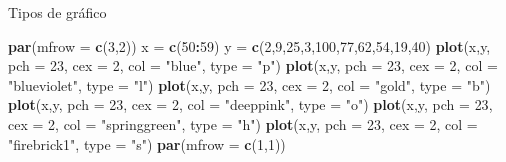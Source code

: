 \documentclass[
  ignorenonframetext,
]{beamer}
\newenvironment{Shaded}{\begin{snugshade}}{\end{snugshade}}
\newcommand{\AttributeTok}[1]{\textcolor[rgb]{0.13,0.29,0.53}{#1}}
\newcommand{\DecValTok}[1]{\textcolor[rgb]{0.00,0.00,0.81}{#1}}
\newcommand{\FunctionTok}[1]{\textcolor[rgb]{0.13,0.29,0.53}{\textbf{#1}}}
\newcommand{\NormalTok}[1]{#1}
\newcommand{\OtherTok}[1]{\textcolor[rgb]{0.56,0.35,0.01}{#1}}
\newcommand{\SpecialCharTok}[1]{\textcolor[rgb]{0.81,0.36,0.00}{\textbf{#1}}}
\newcommand{\StringTok}[1]{\textcolor[rgb]{0.31,0.60,0.02}{#1}}
\begin{document}
\begin{frame}[fragile]{Tipos de gráfico}
\label{tipos-de-gruxe1fico}
\begin{Shaded}
\begin{Highlighting}[]
\FunctionTok{par}\NormalTok{(}\AttributeTok{mfrow =} \FunctionTok{c}\NormalTok{(}\DecValTok{3}\NormalTok{,}\DecValTok{2}\NormalTok{))}
\NormalTok{x }\OtherTok{=} \FunctionTok{c}\NormalTok{(}\DecValTok{50}\SpecialCharTok{:}\DecValTok{59}\NormalTok{)}
\NormalTok{y }\OtherTok{=} \FunctionTok{c}\NormalTok{(}\DecValTok{2}\NormalTok{,}\DecValTok{9}\NormalTok{,}\DecValTok{25}\NormalTok{,}\DecValTok{3}\NormalTok{,}\DecValTok{100}\NormalTok{,}\DecValTok{77}\NormalTok{,}\DecValTok{62}\NormalTok{,}\DecValTok{54}\NormalTok{,}\DecValTok{19}\NormalTok{,}\DecValTok{40}\NormalTok{)}
\FunctionTok{plot}\NormalTok{(x,y, }\AttributeTok{pch =} \DecValTok{23}\NormalTok{, }\AttributeTok{cex =} \DecValTok{2}\NormalTok{, }\AttributeTok{col =} \StringTok{"blue"}\NormalTok{, }\AttributeTok{type =} \StringTok{"p"}\NormalTok{)}
\FunctionTok{plot}\NormalTok{(x,y, }\AttributeTok{pch =} \DecValTok{23}\NormalTok{, }\AttributeTok{cex =} \DecValTok{2}\NormalTok{, }\AttributeTok{col =} \StringTok{"blueviolet"}\NormalTok{, }\AttributeTok{type =} \StringTok{"l"}\NormalTok{)}
\FunctionTok{plot}\NormalTok{(x,y, }\AttributeTok{pch =} \DecValTok{23}\NormalTok{, }\AttributeTok{cex =} \DecValTok{2}\NormalTok{, }\AttributeTok{col =} \StringTok{"gold"}\NormalTok{, }\AttributeTok{type =} \StringTok{"b"}\NormalTok{)}
\FunctionTok{plot}\NormalTok{(x,y, }\AttributeTok{pch =} \DecValTok{23}\NormalTok{, }\AttributeTok{cex =} \DecValTok{2}\NormalTok{, }\AttributeTok{col =} \StringTok{"deeppink"}\NormalTok{, }\AttributeTok{type =} \StringTok{"o"}\NormalTok{)}
\FunctionTok{plot}\NormalTok{(x,y, }\AttributeTok{pch =} \DecValTok{23}\NormalTok{, }\AttributeTok{cex =} \DecValTok{2}\NormalTok{, }\AttributeTok{col =} \StringTok{"springgreen"}\NormalTok{,}
     \AttributeTok{type =} \StringTok{"h"}\NormalTok{)}
\FunctionTok{plot}\NormalTok{(x,y, }\AttributeTok{pch =} \DecValTok{23}\NormalTok{, }\AttributeTok{cex =} \DecValTok{2}\NormalTok{, }\AttributeTok{col =} \StringTok{"firebrick1"}\NormalTok{,}
     \AttributeTok{type =} \StringTok{"s"}\NormalTok{)}
\FunctionTok{par}\NormalTok{(}\AttributeTok{mfrow =} \FunctionTok{c}\NormalTok{(}\DecValTok{1}\NormalTok{,}\DecValTok{1}\NormalTok{))}
\end{Highlighting}
\end{Shaded}
\end{frame}
\end{document}

